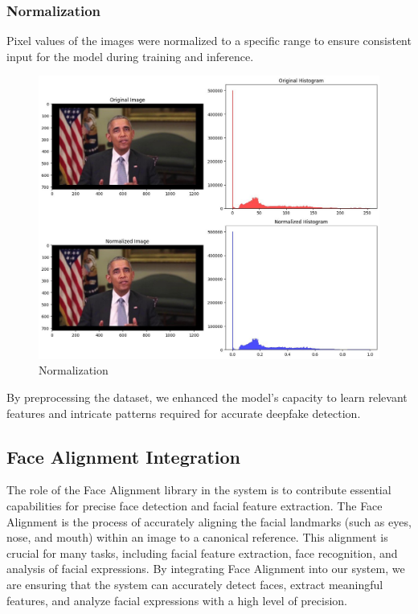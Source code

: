 \subsubsection{Normalization} Pixel values of the images were normalized to a specific range to ensure consistent input for the model during training and inference.

\begin{figure}[htbp]
    \centering
    \includegraphics[width=5in]{img/normalized.jpg}
    \caption{Normalization}
\end{figure}

By preprocessing the dataset, we enhanced the model's capacity to learn relevant features and intricate patterns required for accurate deepfake detection.

\subsection{Face Alignment Integration}

The role of the Face Alignment library in the system is to contribute essential capabilities for precise face detection and facial feature extraction. The Face Alignment is the process of accurately aligning the facial landmarks (such as eyes, nose, and mouth) within an image to a canonical reference. This alignment is crucial for many tasks, including facial feature extraction, face recognition, and analysis of facial expressions. By integrating Face Alignment into our system, we are ensuring that the system can accurately detect faces, extract meaningful features, and analyze facial expressions with a high level of precision.

